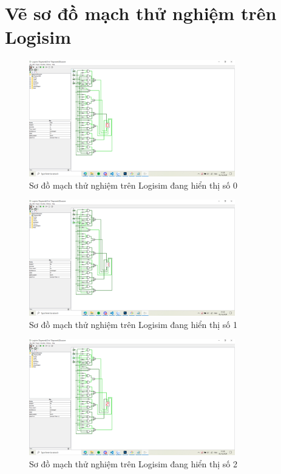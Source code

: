 \section{Vẽ sơ đồ mạch thử nghiệm trên Logisim}

\begin{figure}[H]
	\centering
	\includegraphics[width=0.8\textwidth]{images/0.PNG}
	\caption{Sơ đồ mạch thử nghiệm trên Logisim đang hiển thị số 0}
	\label{fig:circuitDesign}
\end{figure}

\begin{figure}[H]
	\centering
	\includegraphics[width=0.8\textwidth]{images/1.PNG}
	\caption{Sơ đồ mạch thử nghiệm trên Logisim đang hiển thị số 1}
	\label{fig:circuitDesign}
\end{figure}

\begin{figure}[H]
	\centering
	\includegraphics[width=0.8\textwidth]{images/2.PNG}
	\caption{Sơ đồ mạch thử nghiệm trên Logisim đang hiển thị số 2}
	\label{fig:circuitDesign}
\end{figure}

